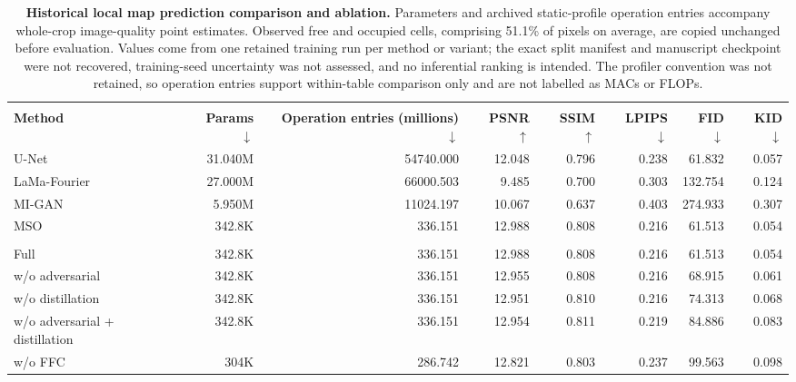 \documentclass[11pt]{article}
\begin{document}
\begin{table}[!htbp]
	\centering
	\caption{\textbf{Historical local map prediction comparison and ablation.} Parameters and archived static-profile operation entries accompany whole-crop image-quality point estimates. Observed free and occupied cells, comprising 51.1\% of pixels on average, are copied unchanged before evaluation. Values come from one retained training run per method or variant; the exact split manifest and manuscript checkpoint were not recovered, training-seed uncertainty was not assessed, and no inferential ranking is intended. The profiler convention was not retained, so operation entries support within-table comparison only and are not labelled as MACs or FLOPs.}
	\label{tab:prediction-results}
	\begingroup
	\setlength{\tabcolsep}{2.3pt}
	\renewcommand{\arraystretch}{1.06}
	\begin{tabularx}{\textwidth}{@{}>{\raggedright\arraybackslash}Xrrrrrrr@{}}
		\toprule
		\multicolumn{8}{@{}l}{\textbf{a, Evaluated prediction models}} \\
		\rowcolor{TableHeader}
		\textbf{Method} & \shortstack{\textbf{Params}\\$\downarrow$} & \shortstack{\textbf{Operation entries}\\\textbf{(millions)} $\downarrow$} & \shortstack{\textbf{PSNR}\\$\uparrow$} & \shortstack{\textbf{SSIM}\\$\uparrow$} & \shortstack{\textbf{LPIPS}\\$\downarrow$} & \shortstack{\textbf{FID}\\$\downarrow$} & \shortstack{\textbf{KID}\\$\downarrow$} \\
		\midrule
		U-Net & 31.040M & 54740.000 & 12.048 & 0.796 & 0.238 & 61.832 & 0.057 \\
		LaMa-Fourier & 27.000M & 66000.503 & 9.485 & 0.700 & 0.303 & 132.754 & 0.124 \\
		MI-GAN & 5.950M & 11024.197 & 10.067 & 0.637 & 0.403 & 274.933 & 0.307 \\
		MSO & 342.8K & 336.151 & 12.988 & 0.808 & 0.216 & 61.513 & 0.054 \\
		\midrule
		\multicolumn{8}{@{}l}{\textbf{b, MSO component ablations}} \\
		Full & 342.8K & 336.151 & 12.988 & 0.808 & 0.216 & 61.513 & 0.054 \\
		w/o adversarial & 342.8K & 336.151 & 12.955 & 0.808 & 0.216 & 68.915 & 0.061 \\
		w/o distillation & 342.8K & 336.151 & 12.951 & 0.810 & 0.216 & 74.313 & 0.068 \\
		w/o adversarial + distillation & 342.8K & 336.151 & 12.954 & 0.811 & 0.219 & 84.886 & 0.083 \\
		w/o FFC & 304K & 286.742 & 12.821 & 0.803 & 0.237 & 99.563 & 0.098 \\
		\bottomrule
	\end{tabularx}
	\endgroup
\end{table}
\end{document}
